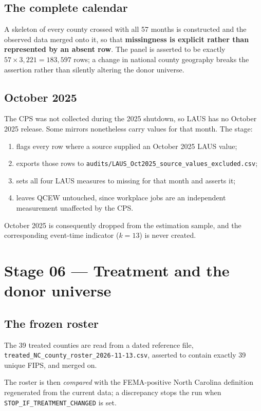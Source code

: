 \documentclass[11pt,a4paper]{article}
\newcommand{\file}[1]{\texttt{\small #1}}
\begin{document}
\subsection{The complete calendar}

A skeleton of every county crossed with all 57 months is constructed and the
observed data merged onto it, so that \textbf{missingness is explicit rather
than represented by an absent row}. The panel is asserted to be exactly
$57\times3{,}221 = 183{,}597$ rows; a change in national county geography
breaks the assertion rather than silently altering the donor universe.

\subsection{October 2025}

The CPS was not collected during the 2025 shutdown, so LAUS has no October 2025
release. Some mirrors nonetheless carry values for that month. The stage:

\begin{enumerate}[leftmargin=1.3em,itemsep=2pt]
\item flags every row where a source supplied an October 2025 LAUS value;
\item exports those rows to
      \file{audits/LAUS\_Oct2025\_source\_values\_excluded.csv};
\item sets all four LAUS measures to missing for that month and asserts it;
\item leaves QCEW untouched, since workplace jobs are an independent
      measurement unaffected by the CPS.
\end{enumerate}

\noindent October 2025 is consequently dropped from the estimation sample, and
the corresponding event-time indicator ($k=13$) is never created.

\section{Stage 06 --- Treatment and the donor universe}

\subsection{The frozen roster}

\begin{sloppypar}
The 39 treated counties are read from a dated reference file,
\file{treated\_NC\_county\_roster\_2026-11-13.csv}, asserted to contain
exactly 39 unique FIPS, and merged on.
\end{sloppypar} The roster is then \emph{compared} with the
FEMA-positive North Carolina definition regenerated from the current data; a
discrepancy stops the run when \texttt{STOP\_IF\_TREATMENT\_CHANGED} is set.
\end{document}
